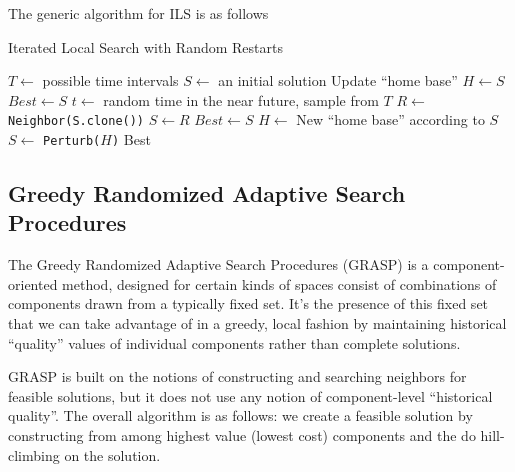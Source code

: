                 The generic algorithm for ILS is as follows
                \begin{algorithm}[!htp]
                    \centering
                    \caption{Iterated Local Search with Random Restarts}
                    \begin{algorithmic}[1]
                        \State $T \gets$ possible time intervals
                        \State $S \gets$ an initial solution
                        \State Update ``home base'' $H \gets S$
                        \State $Best \gets S$
                            \State $t \gets$ random time in the near future, sample from $T$
                                \State $R \gets$ \texttt{Neighbor(S.clone())}
                                    \State $S \gets R$
                                \EndIf
                                    \State $Best \gets S$
                                \EndIf
                                \State $H \gets$ New ``home base'' according to $S$
                                \State $S \gets$ \texttt{Perturb($H$)}
                            \EndWhile
                        \EndWhile
                        \State \Return Best
                    \end{algorithmic}
                \end{algorithm}

        \subsection{Greedy Randomized Adaptive Search Procedures}
            The Greedy Randomized Adaptive Search Procedures (GRASP) is a component-oriented method, designed for certain kinds of spaces consist of combinations of components drawn from a typically fixed set. It's the presence of this fixed set that we can take advantage of in a greedy, local fashion by maintaining historical ``quality'' values of individual components rather than complete solutions.

            GRASP is built on the notions of constructing and searching neighbors for feasible solutions, but it does not use any notion of component-level ``historical quality''. The overall algorithm is as follows: we create a feasible solution by constructing from among highest value (lowest cost) components and the do hill-climbing on the solution.

